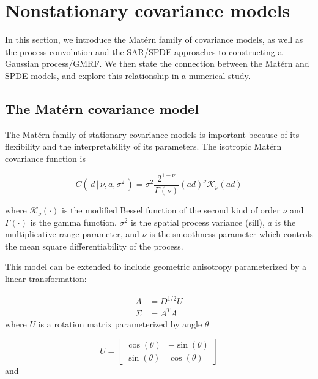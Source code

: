 \documentclass[review]{elsarticle}
\begin{document}
\section{Nonstationary covariance models}

 In this section, we introduce the Mat\'ern family of covariance models, as well as the process convolution and the SAR/SPDE approaches to constructing a Gaussian process/GMRF. We then state the connection between the Mat\'ern and SPDE models, and explore this relationship in a numerical study.


\subsection{The Mat\'ern covariance model}

The Mat\'ern family of stationary covariance models is important because of its flexibility and the interpretability of its parameters. The isotropic Mat\'ern covariance function is

$$ C( \, d \, | \, \nu, a, \sigma^2 \, ) =\sigma ^{2}{\frac {2^{1-\nu }}{\Gamma (\nu )}}{(ad)}^{\nu }\mathcal{K}_{\nu }{(ad)}$$

\iffalse
$$ C( \, d \, | \, \nu, a, \sigma^2 \, ) =  {\frac {\pi^{1/2} \sigma ^{2}}{2^{\nu -1 }\Gamma (\nu+1/2 ) a^{2\nu}}} {(ad)}^{\nu }\mathcal{K}_{\nu }{(ad)}$$
\fi

where $\mathcal{K}_{\nu }(\cdot)$ is the modified Bessel function of the second kind of order $\nu$ and $\Gamma(\cdot)$ is the gamma function. $\sigma^2$ is the spatial process variance (sill), $a$ is the multiplicative range parameter, and $\nu$ is the smoothness parameter which controls the mean square differentiability of the process. 

This model can be extended to include geometric anisotropy parameterized by a linear transformation:

\begin{equation}
\label{e:1}
\begin{split}
   A & =  D^{1/2} U \\ 
   \Sigma & = A^T A
  \end{split}
\end{equation}
where $U$ is a rotation matrix parameterized by angle $\theta$

\[ U = \begin{bmatrix} \cos(\theta) & -\sin(\theta) \\ \sin(\theta) & \cos(\theta) \end{bmatrix} \]
and
\end{document}
